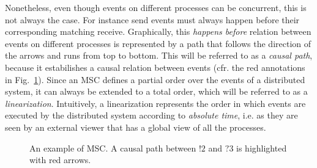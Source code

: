 Nonetheless, even though events on different processes can be concurrent, this is not always the case. For instance send events must always happen before their corresponding matching receive. Graphically, this \emph{happens before} relation between events on different processes is represented by a path that follows the direction of the arrows and runs from top to bottom. This will be referred to as a \emph{causal path}, because it estabilishes a causal relation between events (cfr. the red annotations in  Fig.~\ref{fig:msc_ex}). 
Since an MSC defines a partial order over the events of a distributed system, it can always be extended to a total order, which will be referred to as a \emph{linearization}. 
Intuitively, a linearization represents the order in which events are executed by the distributed system according to \emph{absolute time}, i.e. as they are seen by an external viewer that has a global view of all the processes. 

\begin{figure}[t]
	\begin{center}
		\caption{An example of MSC. A causal path between $!2$ and $?3$ is highlighted with red arrows.}
		\label{fig:msc_ex}
	\end{center}
\end{figure}


